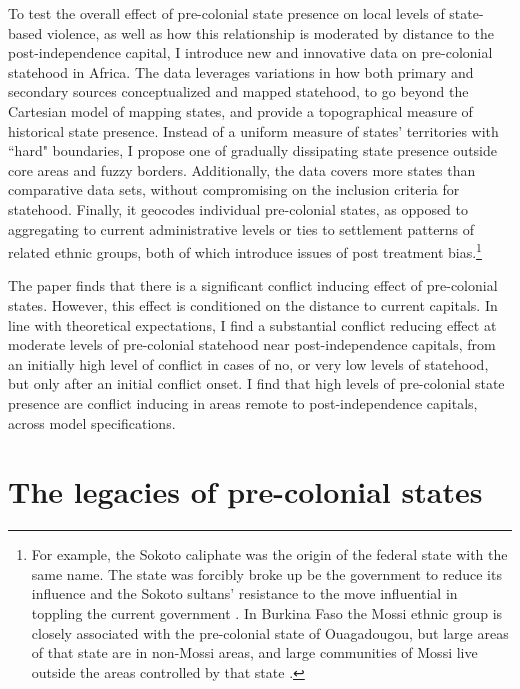 \documentclass[12pt]{article}
\begin{document}
To test the overall effect of pre-colonial state presence on local levels of
state-based violence, as well as how this relationship is moderated by distance
to the post-independence capital, I introduce new and innovative data on
pre-colonial statehood in Africa. The data leverages variations in how both
primary and secondary sources conceptualized and mapped statehood, to go beyond
the Cartesian model of mapping states, and provide a topographical measure of
historical state presence. Instead of a uniform measure of states' territories
with ``hard" boundaries, I propose one of gradually dissipating state presence
outside core areas and fuzzy borders. Additionally, the data covers more states
than comparative data sets, without compromising on the inclusion criteria for
statehood. Finally, it geocodes individual pre-colonial states, as opposed to
aggregating to current administrative levels or ties to settlement patterns of
related ethnic groups, both of which introduce issues of post treatment
bias.\footnote{For example, the Sokoto caliphate was the origin of the federal
state with the same name. The state was forcibly broke up be the government to
reduce its influence and the Sokoto sultans' resistance to the move influential
in toppling the current government \citep{HiribarrenVincent2017AHoB}. In Burkina
Faso the Mossi ethnic group is closely associated with the pre-colonial state of
Ouagadougou, but large areas of that state are in non-Mossi areas, and large
communities of Mossi live outside the areas controlled by that state
\citep{Wishman2021a}.}

The paper finds that there is a significant conflict inducing effect of
pre-colonial states. However, this effect is conditioned on the distance to
current capitals. In line with theoretical expectations, I find a substantial
conflict reducing effect at moderate levels of pre-colonial statehood near
post-independence capitals, from an initially high level of conflict in cases of
no, or very low levels of statehood, but only after an initial conflict onset. I
find that high levels of pre-colonial state presence are conflict inducing in
areas remote to post-independence capitals, across model specifications.

\section{The legacies of pre-colonial states} 
\label{The legacies of pre-colonial states}
\end{document}
